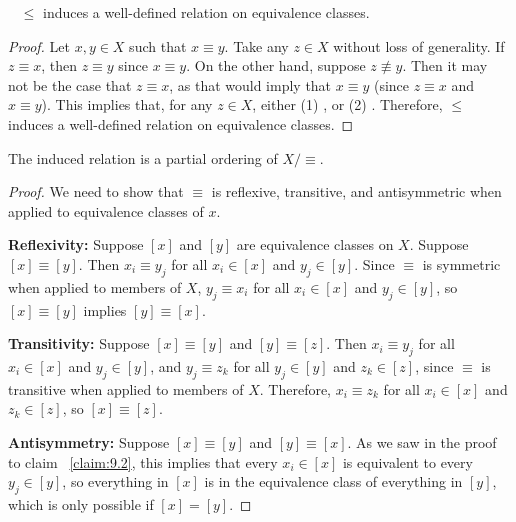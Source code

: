 \begin{Answer}
  \newpage
  \begin{claim}~\label{claim:9.2}
    $\le$ induces a well-defined relation on equivalence classes.
    \begin{proof}
      Let $x, y \in X$ such that $x \equiv y$.
      Take any $z \in X$ without loss of generality.
      If $z \equiv x$, then $z \equiv y$ since $x \equiv y$.
      On the other hand, suppose $z \nequiv y$. Then it may not be the case that
      $z \equiv x$, as that would imply that $x \equiv y$ (since $z \equiv x$ and $x \equiv y$).
      This implies that, for any $z \in X$, either
      (1) ,
      or (2) .
      Therefore, $\le$ induces a well-defined relation on equivalence classes.
    \end{proof}
  \end{claim}
  \begin{claim}
    The induced relation is a partial ordering of $X/\equiv$.
    \begin{proof}
      We need to show that $\equiv$ is reflexive, transitive, and antisymmetric
      when applied to equivalence classes of $x$.

      \step
      \textbf{Reflexivity:} Suppose $[x]$ and $[y]$ are equivalence classes on $X$.
      Suppose $[x] \equiv [y]$.
      Then $x_i \equiv y_j$ for all $x_i \in [x]$ and $y_j \in [y]$.
      Since $\equiv$ is symmetric when applied to members of $X$,
      $y_j \equiv x_i$ for all $x_i \in [x]$ and $y_j \in [y]$,
      so $[x] \equiv [y]$ implies $[y] \equiv [x]$.

      \step
      \textbf{Transitivity:} Suppose $[x] \equiv [y]$ and $[y] \equiv [z]$.
      Then $x_i \equiv y_j$ for all $x_i \in [x]$ and $y_j \in [y]$,
      and $y_j \equiv z_k$ for all $y_j \in [y]$ and $z_k \in [z]$,
      since $\equiv$ is transitive when applied to members of $X$.
      Therefore, $x_i \equiv z_k$ for all $x_i \in [x]$ and $z_k \in [z]$,
      so $[x] \equiv [z]$.

      \step
      \textbf{Antisymmetry:} Suppose $[x] \equiv [y]$ and $[y] \equiv [x]$.
      As we saw in the proof to claim ~\ref{claim:9.2},
      this implies that every $x_i \in [x]$ is equivalent to every $y_j \in [y]$,
      so everything in $[x]$ is in the equivalence class
      of everything in $[y]$, which is only possible if $[x] = [y]$.
    \end{proof}
  \end{claim}
\end{Answer}
